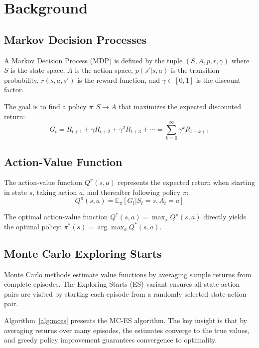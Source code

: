 \documentclass[letterpaper]{article}
\begin{document}
\section{Background}

\subsection{Markov Decision Processes}

A Markov Decision Process (MDP) is defined by the tuple $(S, A, p, r, \gamma)$ where $S$ is the state space, $A$ is the action space, $p(s'|s,a)$ is the transition probability, $r(s,a,s')$ is the reward function, and $\gamma \in [0,1]$ is the discount factor.

The goal is to find a policy $\pi: S \rightarrow A$ that maximizes the expected discounted return:
\begin{equation}
    G_t = R_{t+1} + \gamma R_{t+2} + \gamma^2 R_{t+3} + \cdots = \sum_{k=0}^{\infty} \gamma^k R_{t+k+1}
\end{equation}

\subsection{Action-Value Function}

The action-value function $Q^\pi(s, a)$ represents the expected return when starting in state $s$, taking action $a$, and thereafter following policy $\pi$:
\begin{equation}
    Q^\pi(s, a) = \mathbb{E}_\pi[G_t | S_t = s, A_t = a]
\end{equation}

The optimal action-value function $Q^*(s, a) = \max_\pi Q^\pi(s, a)$ directly yields the optimal policy: $\pi^*(s) = \arg\max_a Q^*(s, a)$.

\subsection{Monte Carlo Exploring Starts}

Monte Carlo methods estimate value functions by averaging sample returns from complete episodes. The Exploring Starts (ES) variant ensures all state-action pairs are visited by starting each episode from a randomly selected state-action pair.

Algorithm~\ref{alg:mces} presents the MC-ES algorithm. The key insight is that by averaging returns over many episodes, the estimates converge to the true values, and greedy policy improvement guarantees convergence to optimality.
\end{document}
